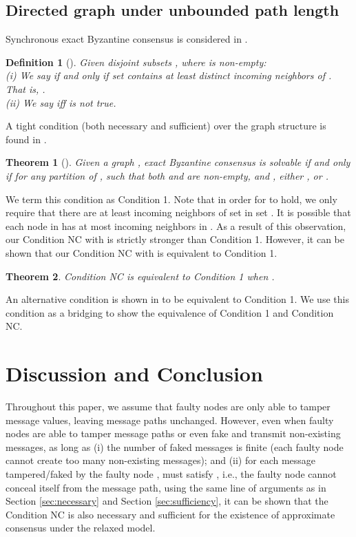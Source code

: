 \documentclass[letterpaper, 11pt]{article}
\newtheorem{definition}{Definition}[section]
\newtheorem{theorem}{Theorem}[section]
\begin{document}
\subsection{Directed graph under unbounded path length}

Synchronous exact Byzantine consensus is considered in \cite{Tseng2014}.  
\begin{definition}[\cite{Tseng2014}]
Given disjoint subsets , where  is non-empty: \\
(i) We say  if and only if set  contains at least  distinct incoming neighbors of . That is, .\\
(ii) We say  iff  is not true.
\end{definition}
A tight condition (both necessary and sufficient) over the graph structure is found in \cite{Tseng2014}.

\begin{theorem}[\cite{Tseng2014}]
Given a graph , exact Byzantine consensus is solvable if and only if for any partition  of , such that both  and  are non-empty, and , either , or .
\end{theorem}

We term this condition as Condition 1. Note that in order for  to hold, we only require that there are at least  incoming neighbors of set  in set . It is possible that each node in  has at most  incoming neighbors in . As a result of this observation, our Condition NC with  is strictly stronger than Condition 1. However, it can be shown that our Condition NC with  is equivalent to Condition 1. 

\begin{theorem}
\label{equivaDirected}
Condition NC is equivalent to Condition 1 when .
\end{theorem}

An alternative condition is shown in \cite{Tseng2014} to be equivalent to Condition 1. We use this condition as a bridging to show the equivalence of Condition 1 and Condition NC.

\section{Discussion and Conclusion}
\label{sec:conclusion}

Throughout this paper, we assume that faulty nodes are only able to tamper message values, leaving
message paths unchanged. However, even when faulty nodes are able to tamper message paths or even fake and transmit non-existing messages,
as long as (i) the number of faked messages is finite (each faulty node  cannot create too many non-existing messages);
and (ii) for each message  tampered/faked by the faulty node ,   must satisfy , i.e., the faulty node  cannot conceal itself from the message path,
using the same line of arguments as in Section \ref{sec:necessary} and Section \ref{sec:sufficiency}, it can be shown that the Condition NC is also necessary and sufficient for the existence of approximate consensus under the relaxed model.
\end{document}
